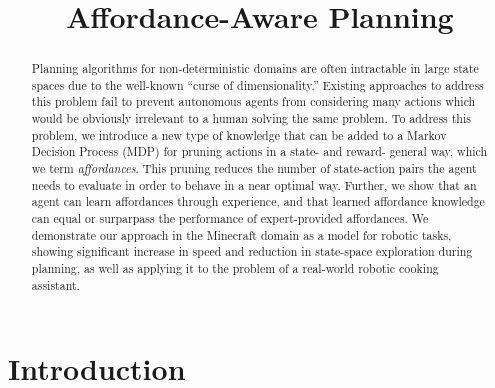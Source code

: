 \documentclass[conference]{IEEEtran}
\begin{document}
\title{Affordance-Aware Planning}

\author{
}

\maketitle

\begin{abstract}
Planning algorithms for non-deterministic domains are often
intractable in large state spaces due to the well-known ``curse of
dimensionality.''  Existing approaches to address this problem fail to
prevent autonomous agents from considering many actions which would be
obviously irrelevant to a human solving the same problem.  To address
this problem, we introduce a new type of knowledge that can be added
to a Markov Decision Process (MDP) for pruning actions in a state- and
reward- general way, which we term {\em affordances}.  This pruning
reduces the number of state-action pairs the agent needs to evaluate
in order to behave in a near optimal way.  Further, we show that an
agent can learn affordances through experience, and that learned
affordance knowledge can equal or surparpass the performance of
expert-provided affordances.  We demonstrate our approach in the
Minecraft domain as a model for robotic tasks, showing significant
increase in speed and reduction in state-space exploration during
planning, as well as applying it to the problem of a real-world
robotic cooking assistant. 


\end{abstract}

\IEEEpeerreviewmaketitle

\section{Introduction}
\label{sec:introduction}
\end{document}
